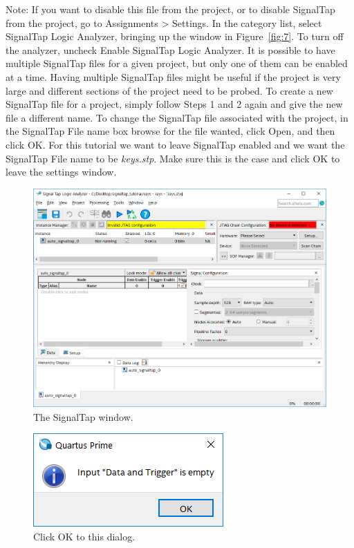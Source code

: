 \documentclass[11pt, twoside, pdftex]{article}
\begin{document}
\begin{enumerate}
Note: If you want to disable this file from the project, or to disable SignalTap from the project, 
go to {\sf Assignments > Settings}. In the category list, select {\sf SignalTap Logic Analyzer}, bringing up the
window in Figure~\ref{fig:7}. To turn off the analyzer, uncheck {\sf Enable SignalTap Logic Analyzer}.
It is possible to have multiple SignalTap files for a given project, but only one of them can
be enabled at a time. Having multiple SignalTap files might be useful if the project is very large and different
sections of the project need to be probed. To create a new SignalTap file for a project, simply follow
Steps 1 and 2 again and give the new file a different name. To change the SignalTap file associated with the project, in the {\sf SignalTap File
name} box browse for the file wanted, click {\sf Open}, and then click {\sf OK}.  For this tutorial we want to leave SignalTap enabled and we want 
the SignalTap File name to be {\it keys.stp}. Make sure this is the case and click {\sf OK} to leave the settings window. 
  
\begin{figure}[H]
   \begin{center}
      \includegraphics[scale=0.6]{figures/figure4.png}
   \caption{The SignalTap window.} 
	 \label{fig:4}
	 \end{center}
\end{figure}

\begin{figure}[H]
   \begin{center}
      \includegraphics[scale=0.65]{figures/figure5.png}
   \caption{Click {\sf OK} to this dialog.} 
	 \label{fig:5}
	 \end{center}
\end{figure}


\end{enumerate}
\end{document}
